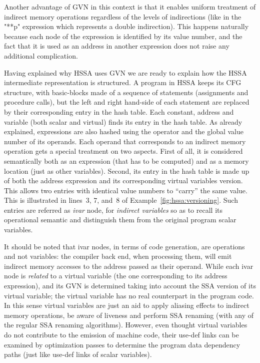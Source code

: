 Another advantage of GVN in this context is that it enables uniform treatment of indirect memory operations regardless of the levels of indirections (like in the "**p" expression which represents a double indirection).
This happens naturally because each node of the expression is identified by its value number, and the fact that it is used as an address in another expression does not raise any additional complication.

Having explained why HSSA uses GVN we are ready to explain how the HSSA intermediate representation is structured.
A program in HSSA keeps its CFG structure, with basic-blocks made of a sequence of statements (assignments and procedure calls), but the left and right hand-side of each statement are replaced by their corresponding entry in the hash table. 
Each constant, address and variable (both scalar and virtual) finds its entry in the hash table.
As already explained, expressions are also hashed using the operator and the global value number of its operands.
Each operand that corresponds to an indirect memory operation gets a special treatment on two aspects.
First of all, it is considered semantically both as an expression (that has to be computed) and as a memory location (just as other variables).
Second, its entry in the hash table is made up of both the address expression and its corresponding virtual variables version.
This allows two entries with identical value numbers to ``carry'' the same value.  This is illustrated in lines~3, 7, and~8 of Example~\ref{fig:hssa:versioning}.
Such entries are referred as \emph{ivar} node, for \emph{indirect variables} so as to recall its operational semantic and distinguish them from the original program scalar variables. 

It should be noted that ivar nodes, in terms of code generation, are operations and not variables: the compiler back end, when processing them, will emit indirect memory accesses to the address passed as their operand.
While each ivar node is \emph{related} to a virtual variable (the one corresponding to its address expression), and its GVN is determined taking into account the SSA version of its virtual variable; the virtual variable has no real counterpart in the program code.
In this sense virtual variables are just an aid to apply aliasing effects to indirect memory operations, be aware of liveness and perform SSA renaming (with any of the regular SSA renaming algorithms).
However, even thought virtual variables do not contribute to the emission of machine code, their use-def links can be examined by optimization passes to determine the program data dependency paths (just like use-def links of scalar variables).

